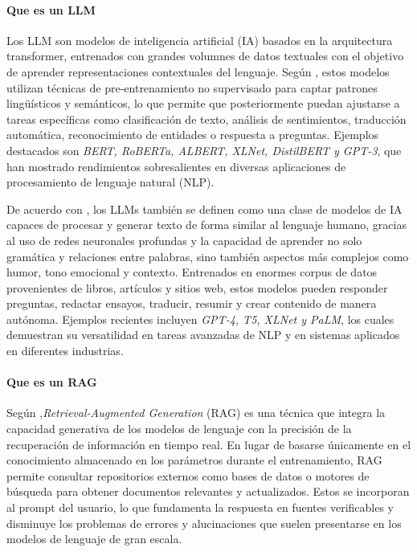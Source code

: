 \paragraph{Que es un LLM}
Los LLM son modelos de inteligencia artificial (IA) basados en la arquitectura transformer, entrenados con grandes volumnes de datos textuales con el objetivo de aprender representaciones
contextuales del lenguaje. Según \textcite{casola2022pretrained}, estos modelos utilizan técnicas de pre-entrenamiento no supervisado para captar patrones lingüísticos y semánticos,
lo que permite que posteriormente puedan ajustarse a tareas específicas como clasificación de texto, análisis de sentimientos, traducción automática, reconocimiento de entidades
o respuesta a preguntas. Ejemplos destacados son \textit{BERT, RoBERTa, ALBERT, XLNet, DistilBERT y GPT-3}, que han mostrado rendimientos sobresalientes en diversas aplicaciones de procesamiento de lenguaje natural (NLP).

De acuerdo con \textcite{ramdurai2025llm}, los LLMs también se definen como una clase de modelos de IA capaces de procesar y generar texto de forma similar al lenguaje humano,
gracias al uso de redes neuronales profundas y la capacidad de aprender no solo gramática y relaciones entre palabras, sino también aspectos más complejos como humor, 
tono emocional y contexto. Entrenados en enormes corpus de datos provenientes de libros, artículos y sitios web, estos modelos pueden responder preguntas, redactar ensayos,
traducir, resumir y crear contenido de manera autónoma. Ejemplos recientes incluyen \textit{GPT-4, T5, XLNet y PaLM}, los cuales demuestran su versatilidad en tareas avanzadas
de NLP y en sistemas aplicados en diferentes industrias. 

\paragraph{Que es un RAG}
Según \textcite{han2024rag},\textit{Retrieval-Augmented Generation} (RAG) es una técnica que integra la capacidad generativa de los modelos 
de lenguaje con la precisión de la recuperación de información en tiempo real. En lugar de basarse únicamente en el conocimiento almacenado en
los parámetros durante el entrenamiento, RAG permite consultar repositorios externos como bases de datos o motores de búsqueda para obtener
documentos relevantes y actualizados. Estos se incorporan al prompt del usuario, lo que fundamenta la respuesta en fuentes 
verificables y disminuye los problemas de errores y alucinaciones que suelen presentarse en los modelos de lenguaje de gran escala.  

